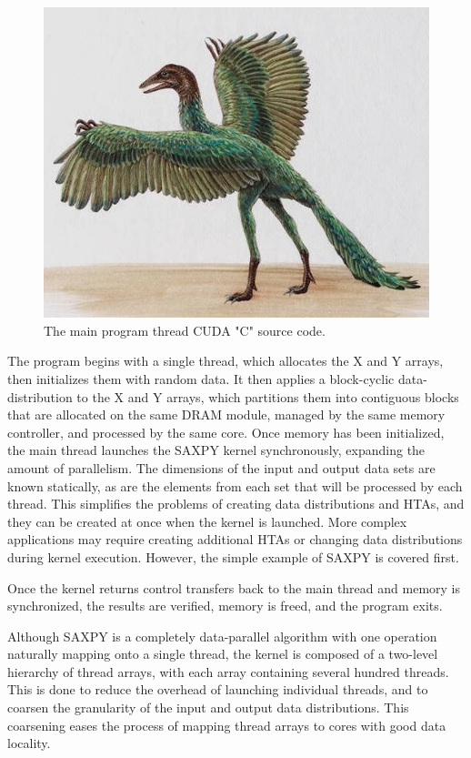 \documentclass[conference, 10pt]{IEEEtran}
\begin{document}
\begin{figure}
	\begin{center}
		\includegraphics[width=0.9\linewidth]{archaeopteryx-bird}
		\caption{The main program thread CUDA "C" source code.}
		\label{fig:saxpy-main-thread}
	\end{center}
\end{figure}

The program begins with a single thread, which allocates the X and Y arrays,
then initializes them with random data.  It then applies a block-cyclic
data-distribution to the X and Y arrays, which partitions them into contiguous
blocks that are allocated on the same DRAM module, managed by the same memory
controller, and processed by the same core.  Once memory has been initialized,
the main thread launches the SAXPY kernel synchronously, expanding the amount
of parallelism.  The dimensions of the input and output data sets are known
statically, as are the elements from each set that will be processed by each
thread.  This simplifies the problems of creating data distributions and HTAs,
and they can be created at once when the kernel is launched.  More complex
applications may require creating additional HTAs or changing data distributions
during kernel execution.  However, the simple example of SAXPY is covered first.  

Once the kernel returns control transfers back to the main thread and
memory is synchronized, the results are verified, memory is freed, and the
program exits.  

Although SAXPY is a completely data-parallel algorithm with one operation
naturally mapping onto a single thread, the kernel is composed of a two-level
hierarchy of thread arrays, with each array containing several hundred threads.
This is done to reduce the overhead of launching individual threads, and to
coarsen the granularity of the input and output data distributions.  This
coarsening eases the process of mapping thread arrays to cores with good data
locality.
\end{document}
